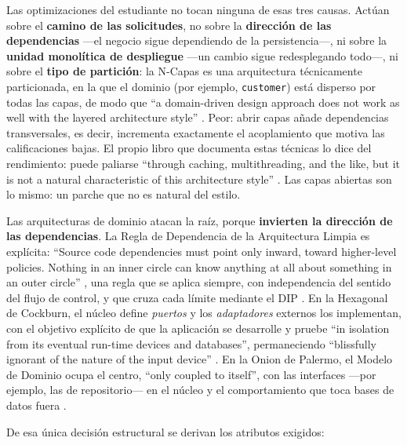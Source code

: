 Las optimizaciones del estudiante no tocan ninguna de esas tres causas. Actúan sobre el
\textbf{camino de las solicitudes}, no sobre la \textbf{dirección de las dependencias} —el
negocio sigue dependiendo de la persistencia—, ni sobre la \textbf{unidad monolítica de
despliegue} —un cambio sigue redesplegando todo—, ni sobre el \textbf{tipo de partición}: la
N-Capas es una arquitectura técnicamente particionada, en la que el dominio (por ejemplo,
\texttt{customer}) está disperso por todas las capas, de modo que “a domain-driven design
approach does not work as well with the layered architecture style”
\parencite[cap.~10]{richardsford2020}. Peor: abrir capas añade dependencias transversales, es
decir, incrementa exactamente el acoplamiento que motiva las calificaciones bajas. El propio
libro que documenta estas técnicas lo dice del rendimiento: puede paliarse “through caching,
multithreading, and the like, but it is not a natural characteristic of this architecture style”
\parencite[cap.~10]{richardsford2020}. Las capas abiertas son lo mismo: un parche que no es
natural del estilo.

Las arquitecturas de dominio atacan la raíz, porque \textbf{invierten la dirección de las
dependencias}. La Regla de Dependencia de la Arquitectura Limpia es explícita: “Source code
dependencies must point only inward, toward higher-level policies. Nothing in an inner circle
can know anything at all about something in an outer circle” \parencite[203]{martin2017}, una
regla que se aplica siempre, con independencia del sentido del flujo de control, y que cruza
cada límite mediante el DIP \parencite[206]{martin2017}. En la Hexagonal de Cockburn, el núcleo
define \emph{puertos} y los \emph{adaptadores} externos los implementan, con el objetivo
explícito de que la aplicación se desarrolle y pruebe “in isolation from its eventual run-time
devices and databases”, permaneciendo “blissfully ignorant of the nature of the input device”
\parencite{cockburn2005}. En la Onion de Palermo, el Modelo de Dominio ocupa el centro, “only
coupled to itself”, con las interfaces —por ejemplo, las de repositorio— en el núcleo y el
comportamiento que toca bases de datos fuera \parencite{palermo2008}.

De esa única decisión estructural se derivan los atributos exigidos:


